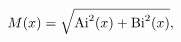 \[\mathop{M\/}\nolimits\!\left(x\right)=\sqrt{{\mathop{\mathrm{Ai}\/}\nolimits^{%
2}}\!\left(x\right)+{\mathop{\mathrm{Bi}\/}\nolimits^{2}}\!\left(x\right)},\]